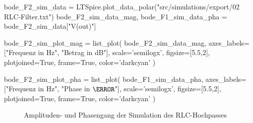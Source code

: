 \begin{sagesilent}
    bode_F2_sim_data = LTSpice.plot_data_polar("src/simulations/export/02 RLC-Filter.txt")
    bode_F2_sim_data_mag, bode_F1_sim_data_pha = bode_F2_sim_data["V(out)"]

    bode_F2_sim_plot_mag = list_plot(
        bode_F2_sim_data_mag,
        axes_labels=["Frequenz in Hz", "Betrag in dB"],
        scale='semilogx',
        figsize=[5.5,2],
        plotjoined=True,
        frame=True,
        color='darkcyan'
    )

    bode_F2_sim_plot_pha = list_plot(
        bode_F1_sim_data_pha,
        axes_labels=["Frequenz in Hz", "Phase in $\degree$"],
        scale='semilogx',
        figsize=[5.5,2],
        plotjoined=True,
        frame=True,
        color='darkcyan'
    )
\end{sagesilent}

\begin{figure}[H]
    \centering
    \begin{subfigure}{\textwidth}
        \centering
    \end{subfigure}
    \quad
    \begin{subfigure}{\textwidth}
        \centering
    \end{subfigure}
    \caption{Amplituden- und Phasengang der Simulation des RLC-Hochpasses}
    \label{fig:F2_Sim}
\end{figure}